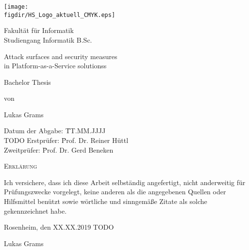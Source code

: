 \begin{titlepage}

\sffamily

\raggedleft

\vspace*{-2cm}

\texttt{[image: \\figdir/HS\_Logo\_aktuell\_CMYK.eps]}

\vfill

\centering
\Huge
Fakultät für Informatik  \vspace{0.5cm}\\
\Large
Studiengang Informatik B.Sc.

\Huge
Attack surfaces and security measures \\
in Platform-as-a-Service solutionss

\vspace{2cm}

\Large
Bachelor Thesis


\vspace{1.5cm}

\Large
von

\vspace{0.5cm}

\LARGE
Lukas Grams

\vspace{1cm}

\flushleft
 \Large
\vspace*{\fill}

\begin{tabbing}
Datum der Abgabe: \= TT.MM.JJJJ \\ TODO
Erstprüfer: \= Prof. Dr. Reiner Hüttl \\
Zweitprüfer: \= Prof. Dr. Gerd Beneken \\
\end{tabbing}

\end{titlepage}


\cleardoubleemptypage

{
\large
\thispagestyle{empty}
\vspace*{\fill}

\noindent
\textsc{Erklärung}

\medskip

\noindent
Ich versichere, dass ich diese Arbeit selbständig
angefertigt, nicht anderweitig für Prüfungszwecke
vorgelegt, keine anderen als die angegebenen Quellen
oder Hilfsmittel benützt sowie wörtliche und
sinngemäße Zitate als solche gekennzeichnet habe.

\bigskip

\noindent
Rosenheim, den XX.XX.2019 TODO

\vspace*{2cm}

\noindent
Lukas Grams
}